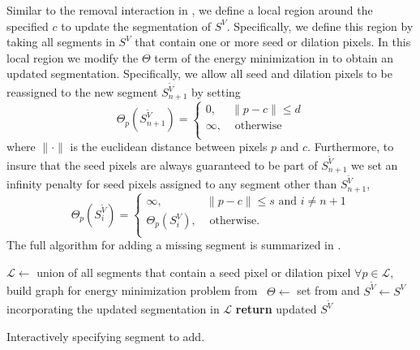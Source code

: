 \documentclass[]{spie}  %
\begin{document}
Similar to the removal interaction in , we define a local
region around the specified $c$ to update the segmentation of $S^V$.
Specifically, we define this region by taking all segments in $S^V$
that contain one or more seed or dilation pixels.  In this local
region we modify the $\Theta$ term of the energy minimization in
 to obtain an updated segmentation.  Specifically, we
allow all seed and dilation pixels to be reassigned to the new segment
$S^{\tilde{V}}_{n+1}$ by setting
\begin{equation}
  \label{eq:d}
  \Theta_p(S^{\tilde{V}}_{n+1}) = \left\{
    \begin{array}{lcr}
      0, & \| p - c \| \leq d  \\
      \infty, & \textrm{ otherwise} \\
    \end{array}
  \right.
\end{equation}
where $\| \cdot \|$ is the euclidean distance between pixels $p$ and
$c$.  %
Furthermore, to insure that the seed pixels are always guaranteed to
be part of $S^{\tilde{V}}_{n+1}$ we set an infinity penalty for seed
pixels assigned to any segment other than $S^{\tilde{V}}_{n+1}$, 
\begin{equation}
  \label{eq:s}
  \Theta_p(S^{\tilde{V}}_i) = \left\{
    \begin{array}{lcr}
      \infty, & \| p - c \| \leq s \textrm{ and } i \neq n+1  \\
      \Theta_p(S^{V}_i), & \textrm{ otherwise.} \\
    \end{array}
  \right.
\end{equation}
The full algorithm for adding a missing segment is summarized in
.
\begin{algorithm}[!t]
  \centering
  \algrenewcommand{}
  \begin{algorithmic}[1]
    \State $\mathcal{L} \gets$ union of all segments that contain a seed pixel or dilation pixel
    \State $\forall p \in \mathcal{L}$, build graph for energy minimization problem from~\cite{waggoner:11}
    \State $\Theta \gets $ set from  and 
    \State $S^{\tilde{V}} \gets S^V$ incorporating the updated segmentation in $\mathcal{L}$
    \State \textbf{return} updated $S^{\tilde{V}}$
    \EndFunction
  \end{algorithmic}
  \caption{Interactively specifying segment to add.}
  \label{alg:addition}
\end{algorithm}
\end{document}
